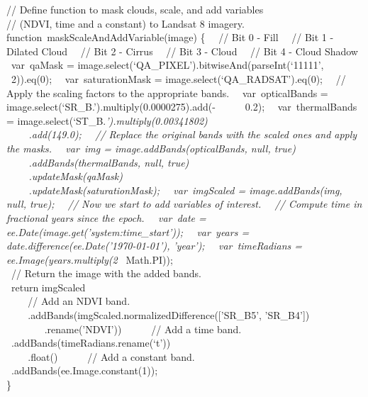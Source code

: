 \documentclass[
  letterpaper,
  DIV=11,
  numbers=noendperiod]{scrreprt}
\begin{document}
// Define function to mask clouds, scale, and add variables\\
// (NDVI, time and a constant) to Landsat 8 imagery.\\
function~maskScaleAndAddVariable(image) \{~ ~// Bit 0 - Fill~ ~// Bit 1
- Dilated Cloud~ ~// Bit 2 - Cirrus~ ~// Bit 3 - Cloud~ ~// Bit 4 -
Cloud Shadow~ ~var~qaMask =
image.select(`QA\_PIXEL').bitwiseAnd(parseInt(`11111',~ ~ ~ ~2)).eq(0);~
~var~saturationMask = image.select(`QA\_RADSAT').eq(0);~ ~// Apply the
scaling factors to the appropriate bands.~ ~var~opticalBands =
image.select(`SR\_B.').multiply(0.0000275).add(-~ ~ ~ ~0.2);~
~var~thermalBands = image.select(`ST\_B.\emph{').multiply(0.00341802)\\
\hspace*{0.333em} ~ ~ ~.add(149.0);~ ~// Replace the original bands with
the scaled ones and apply the masks.~ ~var~img =
image.addBands(opticalBands, null, true)\\
\hspace*{0.333em} ~ ~ ~.addBands(thermalBands, null, true)\\
\hspace*{0.333em} ~ ~ ~.updateMask(qaMask)\\
\hspace*{0.333em} ~ ~ ~.updateMask(saturationMask);~ ~var~imgScaled =
image.addBands(img, null, true);~ ~// Now we start to add variables of
interest.~ ~// Compute time in fractional years since the epoch.~
~var~date = ee.Date(image.get('system:time\_start'));~ ~var~years =
date.difference(ee.Date('1970-01-01'), 'year');~ ~var~timeRadians =
ee.Image(years.multiply(2~} Math.PI));\\
\hspace*{0.333em} ~// Return the image with the added bands.\\
\hspace*{0.333em} ~return imgScaled\\
\hspace*{0.333em} ~ ~ ~// Add an NDVI band.\\
\hspace*{0.333em} ~ ~
~.addBands(imgScaled.normalizedDifference({[}'SR\_B5', 'SR\_B4'{]})\\
\hspace*{0.333em} ~ ~ ~ ~ ~.rename('NDVI'))~ ~ ~ ~// Add a time band.~ ~
~ ~.addBands(timeRadians.rename(`t'))\\
\hspace*{0.333em} ~ ~ ~.float()~ ~ ~ ~// Add a constant band.~ ~ ~
~.addBands(ee.Image.constant(1));\\
\}
\end{document}
